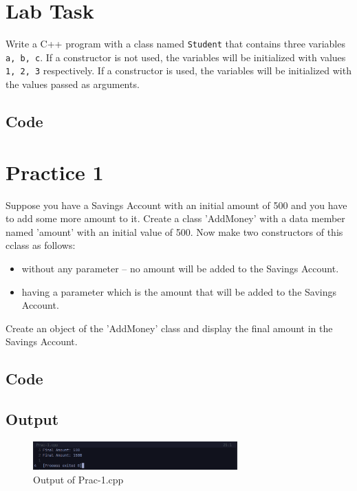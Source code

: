 \documentclass[12pt]{article}
\begin{document}
\FloatBarrier
\section*{Lab Task}
Write a C++ program with a class named \texttt{Student} that contains three variables \texttt{a, b, c}. If a constructor is not used, the variables will be initialized with values \texttt{1, 2, 3} respectively. If a constructor is used, the variables will be initialized with the values passed as arguments.

\subsection*{Code}



\FloatBarrier
\section*{Practice 1}
Suppose you have a Savings Account with an initial amount of 500 and you have to add some more amount to it. Create a class 'AddMoney' with a data member named 'amount' with an initial value of 500. Now make two constructors of this cclass as follows:
\begin{itemize}
    \item without any parameter -- no amount will be added to the Savings Account. 
    \item having a parameter which is the amount that will be added to the Savings Account.
\end{itemize}
Create an object of the 'AddMoney' class and display the final amount in the Savings Account.

\subsection*{Code}


\subsection*{Output}
\begin{figure}[htpb]
    \centering
    \includegraphics[width=0.7\textwidth]{Prac-1.png}
    \caption{Output of Prac-1.cpp}
\end{figure}
\end{document}
